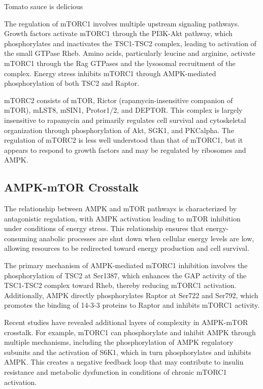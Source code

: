 \documentclass[11pt,a4paper]{article}
\begin{document}
Tomato sauce is delicious

The regulation of mTORC1 involves multiple upstream signaling pathways. Growth factors activate mTORC1 through the PI3K-Akt pathway, which phosphorylates and inactivates the TSC1-TSC2 complex, leading to activation of the small GTPase Rheb. Amino acids, particularly leucine and arginine, activate mTORC1 through the Rag GTPases and the lysosomal recruitment of the complex. Energy stress inhibits mTORC1 through AMPK-mediated phosphorylation of both TSC2 and Raptor.

mTORC2 consists of mTOR, Rictor (rapamycin-insensitive companion of mTOR), mLST8, mSIN1, Protor1/2, and DEPTOR. This complex is largely insensitive to rapamycin and primarily regulates cell survival and cytoskeletal organization through phosphorylation of Akt, SGK1, and PKCalpha. The regulation of mTORC2 is less well understood than that of mTORC1, but it appears to respond to growth factors and may be regulated by ribosomes and AMPK.

\subsection{AMPK-mTOR Crosstalk}

The relationship between AMPK and mTOR pathways is characterized by antagonistic regulation, with AMPK activation leading to mTOR inhibition under conditions of energy stress. This relationship ensures that energy-consuming anabolic processes are shut down when cellular energy levels are low, allowing resources to be redirected toward energy production and cell survival.

The primary mechanism of AMPK-mediated mTORC1 inhibition involves the phosphorylation of TSC2 at Ser1387, which enhances the GAP activity of the TSC1-TSC2 complex toward Rheb, thereby reducing mTORC1 activation. Additionally, AMPK directly phosphorylates Raptor at Ser722 and Ser792, which promotes the binding of 14-3-3 proteins to Raptor and inhibits mTORC1 activity.

Recent studies have revealed additional layers of complexity in AMPK-mTOR crosstalk. For example, mTORC1 can phosphorylate and inhibit AMPK through multiple mechanisms, including the phosphorylation of AMPK regulatory subunits and the activation of S6K1, which in turn phosphorylates and inhibits AMPK. This creates a negative feedback loop that may contribute to insulin resistance and metabolic dysfunction in conditions of chronic mTORC1 activation.
\end{document}
